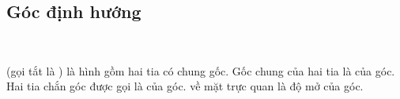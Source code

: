 \subsection{Góc định hướng}

\ %

 (gọi tắt là ) là hình gồm hai tia có chung gốc. Gốc chung của hai tia là  của góc. Hai tia chắn góc được gọi là  của góc.  về mặt trực quan là độ mở của góc.